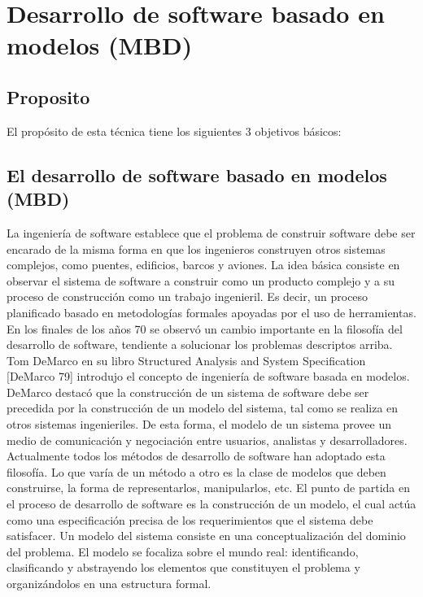 \section{Desarrollo de software basado en modelos (MBD)} 

\subsection{Proposito}
El propósito de esta técnica tiene los siguientes 3 objetivos básicos:

\begin{flushleft}

\begin{center}
	
	\end{center}
\begin{itemize}
\subsection{El desarrollo de software basado en modelos (MBD)}
La ingeniería de software establece que el problema de construir software debe ser encarado de la misma forma en que los ingenieros construyen otros sistemas complejos, como puentes, edificios, barcos y aviones. La idea básica consiste en observar el sistema de software a construir como un producto complejo y a su proceso de construcción como un trabajo ingenieril. Es decir, un proceso planificado basado en metodologías formales apoyadas por el uso de herramientas. 
En los finales de los años 70 se observó un cambio importante en la filosofía del desarrollo de software, tendiente a solucionar los problemas descriptos arriba. Tom DeMarco en su libro Structured Analysis and System Specification [DeMarco 79] introdujo el concepto de ingeniería de software basada en modelos. DeMarco destacó que la construcción de un sistema de software debe ser precedida por la construcción de un modelo del sistema, tal como se realiza en otros sistemas ingenieriles. De esta forma, el modelo de un sistema provee un medio de comunicación y negociación entre usuarios, analistas y desarrolladores. Actualmente todos los métodos de desarrollo de software han adoptado esta filosofía. Lo que varía de un método a otro es la clase de modelos que deben construirse, la forma de representarlos, manipularlos, etc. El punto de partida en el proceso de desarrollo de software es la construcción de un modelo, el cual actúa como una especificación precisa de los requerimientos que el sistema debe satisfacer.  Un modelo del sistema consiste en una conceptualización del dominio del problema. El modelo  se focaliza sobre el mundo real: identificando, clasificando y abstrayendo los elementos que constituyen el problema y organizándolos en una estructura formal. 


\end{itemize}
\end{flushleft}
